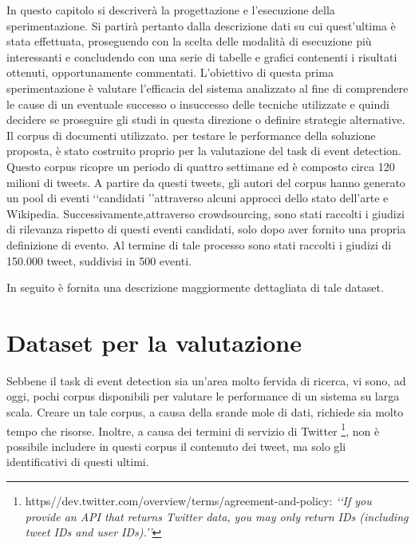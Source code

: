 



In questo capitolo si descriverà la progettazione e l'esecuzione della sperimentazione. Si partirà pertanto dalla descrizione dati su cui quest'ultima è stata effettuata, proseguendo con la scelta delle modalità di esecuzione più interessanti e concludendo con una serie di tabelle e grafici contenenti i risultati ottenuti, opportunamente commentati.  
L'obiettivo di questa prima sperimentazione è valutare l'efficacia del sistema analizzato al fine di comprendere le cause di un eventuale successo o insuccesso delle tecniche utilizzate e quindi decidere se proseguire gli studi in questa direzione o definire strategie alternative.
Il corpus di documenti utilizzato\cite{McMinn:2013:BLC:2505515.2505695}. per testare le performance della soluzione proposta, è stato costruito proprio per la valutazione del task di event detection. Questo corpus ricopre un periodo di quattro settimane ed è composto circa 120 milioni di tweets. A partire da questi tweets, gli autori del corpus hanno generato un pool di eventi \lq\lq candidati \rq\rq attraverso alcuni approcci dello stato dell'arte e Wikipedia. Successivamente,attraverso crowdsourcing, sono stati raccolti i giudizi di rilevanza rispetto di questi eventi candidati, solo dopo aver fornito una propria definizione di evento.
Al termine di tale processo sono stati raccolti i giudizi di 150.000 tweet, suddivisi in 500 eventi. 

In seguito è fornita una descrizione maggiormente dettagliata di tale dataset.
\section{Dataset per la valutazione}


Sebbene il task di event detection sia un'area molto fervida di ricerca, vi sono, ad oggi, pochi corpus disponibili per valutare le performance di un sistema su larga scala. Creare un tale corpus, a causa della srande mole di dati, richiede sia molto tempo che risorse. Inoltre, a causa dei termini di servizio di Twitter
\footnote{https//dev.twitter.com/overview/terms/agreement-and-policy: \emph{\lq\lq If you provide an API that returns Twitter data, you may only return IDs (including tweet IDs and user IDs).\rq\rq}},
 non è possibile includere in questi corpus il contenuto dei tweet, ma solo gli identificativi di questi ultimi.

